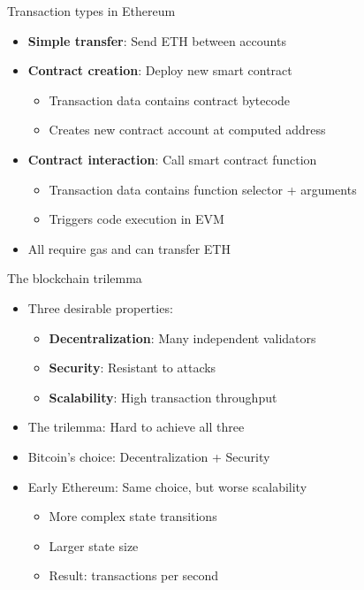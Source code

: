 \documentclass[aspectratio=169, lualatex, handout]{beamer}
\begin{document}
\begin{frame}{Transaction types in Ethereum}
	\begin{itemize}
		\item \textbf{Simple transfer}: Send ETH between accounts
		\item \textbf{Contract creation}: Deploy new smart contract
		      \begin{itemize}
			      \item Transaction data contains contract bytecode
			      \item Creates new contract account at computed address
		      \end{itemize}
		\item \textbf{Contract interaction}: Call smart contract function
		      \begin{itemize}
			      \item Transaction data contains function selector + arguments
			      \item Triggers code execution in EVM
		      \end{itemize}
		\item All require gas and can transfer ETH
	\end{itemize}
\end{frame}

\begin{frame}{The blockchain trilemma}
	\begin{itemize}
		\item Three desirable properties:
		      \begin{itemize}
			      \item \textbf{Decentralization}: Many independent validators
			      \item \textbf{Security}: Resistant to attacks
			      \item \textbf{Scalability}: High transaction throughput
		      \end{itemize}
		\item The trilemma: Hard to achieve all three
		\item Bitcoin's choice: Decentralization + Security
		\item Early Ethereum: Same choice, but worse scalability
		      \begin{itemize}
			      \item More complex state transitions
			      \item Larger state size
			      \item Result:  transactions per second
		      \end{itemize}
	\end{itemize}
\end{frame}
\end{document}
